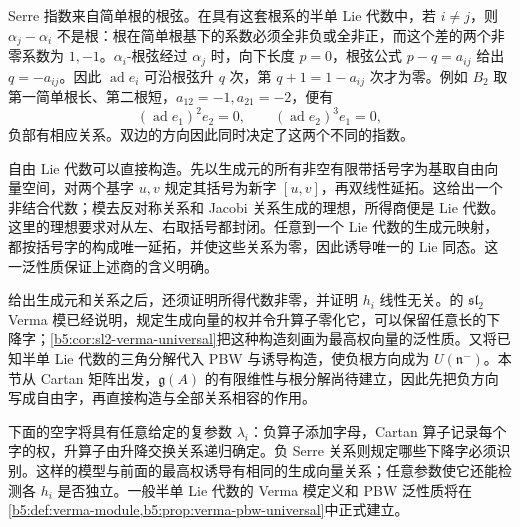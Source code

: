 Serre 指数来自简单根的根弦。在具有这套根系的半单 Lie 代数中，若 \(i\ne j\)，则 \(\alpha_j-\alpha_i\) 不是根：根在简单根基下的系数必须全非负或全非正，而这个差的两个非零系数为 \(1,-1\)。\(\alpha_i\)-根弦经过 \(\alpha_j\) 时，向下长度 \(p=0\)，根弦公式 \(p-q=a_{ij}\) 给出 \(q=-a_{ij}\)。因此 \(\operatorname{ad}e_i\) 可沿根弦升 \(q\) 次，第 \(q+1=1-a_{ij}\) 次才为零。例如 \(B_2\) 取第一简单根长、第二根短，\(a_{12}=-1,a_{21}=-2\)，便有
\[
	(\operatorname{ad}e_1)^2e_2=0,\qquad (\operatorname{ad}e_2)^3e_1=0,
\]
负部有相应关系。双边的方向因此同时决定了这两个不同的指数。

\ProseParagraphBreak

自由 Lie 代数可以直接构造。先以生成元的所有非空有限带括号字为基取自由向量空间，对两个基字 \(u,v\) 规定其括号为新字 \([u,v]\)，再双线性延拓。这给出一个非结合代数；模去反对称关系和 Jacobi 关系生成的理想，所得商便是 Lie 代数。这里的理想要求对从左、右取括号都封闭。任意到一个 Lie 代数的生成元映射，都按括号字的构成唯一延拓，并使这些关系为零，因此诱导唯一的 Lie 同态。这一泛性质保证上述商的含义明确。

\ProseParagraphBreak

给出生成元和关系之后，还须证明所得代数非零，并证明 \(h_i\) 线性无关。的 \(\mathfrak{sl}_2\) Verma 模已经说明，规定生成向量的权并令升算子零化它，可以保留任意长的下降字；\cref{b5:cor:sl2-verma-universal}把这种构造刻画为最高权向量的泛性质。又将已知半单 Lie 代数的三角分解代入 PBW 与诱导构造，使负根方向成为 \(U(\mathfrak n^-)\)。本节从 Cartan 矩阵出发，\(\mathfrak g(A)\) 的有限维性与根分解尚待建立，因此先把负方向写成自由字，再直接构造与全部关系相容的作用。

\ProseParagraphBreak

下面的空字将具有任意给定的复参数 \(\lambda_i\)：负算子添加字母，Cartan 算子记录每个字的权，升算子由升降交换关系递归确定。负 Serre 关系则规定哪些下降字必须识别。这样的模型与前面的最高权诱导有相同的生成向量关系；任意参数使它还能检测各 \(h_i\) 是否独立。一般半单 Lie 代数的 Verma 模定义和 PBW 泛性质将在\cref{b5:def:verma-module,b5:prop:verma-pbw-universal}中正式建立。

